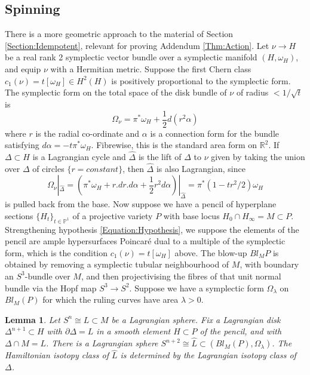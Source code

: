 \documentclass[reqno,10pt]{amsart}
\numberwithin{equation}{section}
\newcommand{\bP}{{\mathbb P}}
\newcommand{\bR}{{\mathbb R}}
\newtheorem{Lemma}[thm]{Lemma}
\theoremstyle{remark}
\begin{document}
\subsection{Spinning\label{Section:Spinning}}
 There is a more geometric approach to the material of Section \ref{Section:Idempotent}, relevant for proving Addendum \ref{Thm:Action}.  Let $\nu \rightarrow H$ be a real rank 2 symplectic vector bundle over a symplectic manifold $(H,\omega_H)$, and equip $\nu$ with a Hermitian metric.  Suppose the first Chern class $c_1(\nu) = t [\omega_H] \in H^2(H)$ is positively proportional to the symplectic form.  The symplectic form on the total space of the disk bundle of $\nu$  of radius $< 1/\sqrt{t}$ is 
 \[
\Omega_{\nu}  = \pi^*\omega_H + \frac{1}{2} d(r^2 \alpha)
\]
where $r$ is the radial co-ordinate and $\alpha$ is a connection form for the bundle satisfying $d\alpha = -t \pi^*\omega_H$. Fibrewise, this is the standard area form on $\bR^2$. If $\Delta \subset H$ is a Lagrangian cycle and $\hat{\Delta}$ is the lift of $\Delta$ to $\nu$ given by taking the union over $\Delta$ of circles $\{r=constant\}$, then $\hat{\Delta}$ is also Lagrangian, since
\[
\Omega_{\nu}|_{\hat\Delta} = (\pi^*\omega_H + r.dr.d\alpha + \frac{1}{2} r^2 d\alpha)|_{\hat\Delta} = \pi^*(1 - t r^2 / 2)\omega_H
\]
is pulled back from the base.  Now suppose we have a pencil of hyperplane sections $\{H_t\}_{t\in\bP^1}$ of a projective variety $P$ with base locus $H_0\cap H_{\infty} = M \subset P$.  Strengthening hypothesis \eqref{Equation:Hypothesis}, we suppose the elements of the pencil are ample hypersurfaces Poincar\'e dual to a multiple of the symplectic form, which is the condition $c_1(\nu) = t [\omega_H]$ above. The blow-up $Bl_MP$ is obtained by removing a symplectic tubular neighbourhood of $M$, with boundary an $S^3$-bundle over $M$, and then projectivising the fibres of that unit normal bundle via the Hopf map $S^3 \rightarrow S^2$. Suppose we have a symplectic form $\Omega_{\lambda}$ on $Bl_M(P)$ for which the ruling curves have area $\lambda > 0$.


\begin{Lemma} \label{lem:spin}
Let $S^n\cong L\subset M$ be a Lagrangian sphere.  Fix a Lagrangian disk $\Delta^{n+1}\subset H$ with $\partial \Delta = L$ in a smooth element $H\subset P$ of the pencil, and with $\Delta \cap M = L$.  There is a Lagrangian sphere $S^{n+2}\cong\hat{L} \subset (Bl_M(P),\Omega_{\lambda})$. The Hamiltonian isotopy class of $\hat{L}$ is determined by the Lagrangian isotopy class of $\Delta$.
\end{Lemma}
\end{document}

